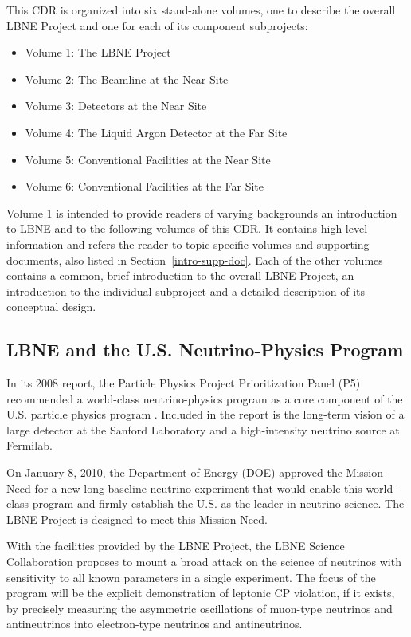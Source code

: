 This CDR is organized into six stand-alone volumes, one to describe the overall LBNE Project and one for each of its component subprojects: 
\begin{itemize}
\item Volume 1: The LBNE Project
\item Volume 2: The Beamline at the Near Site
\item Volume 3: Detectors at the Near Site
\item Volume 4: The Liquid Argon Detector at the Far Site
\item Volume 5: Conventional Facilities at the Near Site
\item Volume 6: Conventional Facilities at the Far Site
\end{itemize}

Volume 1 is intended to provide readers of varying backgrounds an introduction to LBNE and to the following volumes of this CDR.  It contains high-level information and refers the reader to topic-specific volumes and supporting documents, also listed in Section~\ref{intro-supp-doc}. 
Each of the other volumes contains a common, brief introduction to the overall LBNE Project, an introduction to the individual subproject and a detailed description of its conceptual design. 

\subsection{LBNE and the U.S. Neutrino-Physics Program}

In its 2008 report, the Particle Physics Project Prioritization Panel (P5) recommended a world-class
neutrino-physics program as a core component of the U.S. particle physics program \cite{p5report}. Included
in the report is the long-term vision of a large detector at the Sanford Laboratory and a high-intensity neutrino source at  Fermilab.

On January 8, 2010, the Department of Energy (DOE) approved the Mission Need for a new long-baseline
neutrino experiment that would enable this world-class program and firmly establish the
U.S. as the leader in neutrino science. The LBNE Project is designed to meet this Mission Need.

With the facilities provided by the LBNE Project, the LBNE Science Collaboration proposes to mount a broad attack on the science of neutrinos with sensitivity to all known parameters in a single experiment.  The focus of the program will be the explicit demonstration of leptonic CP violation, if it exists, by precisely measuring the asymmetric oscillations of muon-type neutrinos and antineutrinos into 
electron-type neutrinos and antineutrinos.

